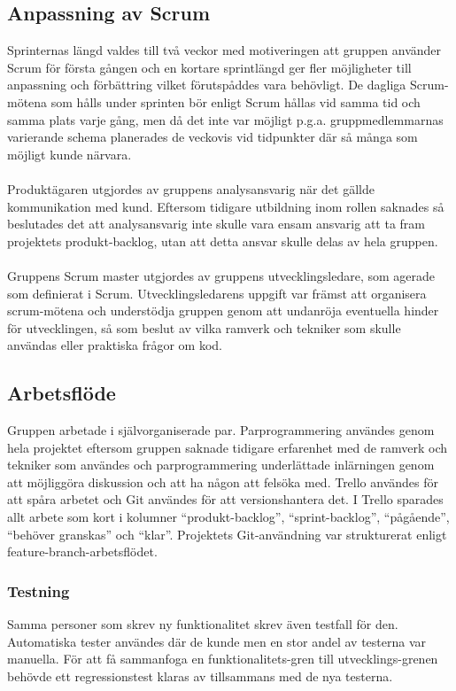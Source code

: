 \subsection{Anpassning av Scrum}
Sprinternas längd valdes till två veckor med motiveringen att gruppen använder Scrum för första gången
och en kortare sprintlängd ger fler möjligheter till anpassning och förbättring vilket förutspåddes
vara behövligt. De dagliga Scrum-mötena som hålls under sprinten bör enligt Scrum hållas vid samma
tid och samma plats varje gång, men då det inte var möjligt p.g.a. gruppmedlemmarnas varierande schema
planerades de veckovis vid tidpunkter där så många som möjligt kunde närvara.
\\ \\
Produktägaren utgjordes av gruppens analysansvarig när det gällde kommunikation med kund. Eftersom
tidigare utbildning inom rollen saknades så beslutades det att analysansvarig inte skulle vara ensam
ansvarig att ta fram projektets produkt-backlog, utan att detta ansvar skulle delas av hela gruppen.
\\ \\
Gruppens Scrum master utgjordes av gruppens utvecklingsledare, som agerade som definierat i Scrum.
Utvecklingsledarens uppgift var främst att organisera scrum-mötena och understödja gruppen
genom att undanröja eventuella hinder för utvecklingen, så som beslut av vilka ramverk och tekniker
som skulle användas eller praktiska frågor om kod.

\subsection{Arbetsflöde}
\label{sec:scrum-work-methodology}
Gruppen arbetade i självorganiserade par. Parprogrammering användes genom hela projektet
eftersom gruppen saknade tidigare erfarenhet med de ramverk och tekniker som användes
och parprogrammering underlättade inlärningen genom att möjliggöra diskussion och att ha
någon att felsöka med. Trello användes för att spåra arbetet och Git användes för att
versionshantera det. I Trello sparades allt arbete som kort i
kolumner “produkt-backlog”, “sprint-backlog”, “pågående”, “behöver granskas” och “klar”.
Projektets Git-användning var strukturerat enligt feature-branch-arbetsflödet. 

\subsubsection{Testning}
Samma personer som skrev ny funktionalitet skrev även testfall för den. Automatiska tester användes
där de kunde men en stor andel av testerna var manuella. För att få sammanfoga
en funktionalitets-gren till utvecklings-grenen behövde ett regressionstest klaras av
tillsammans med de nya testerna.

